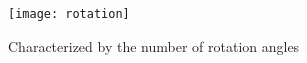 \begin{figure}
\centering
\texttt{[image: rotation]}
\caption{Characterized by the number of rotation angles}
\label{rot}
\end{figure}